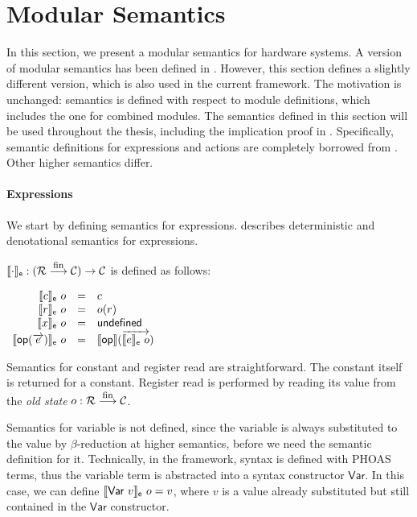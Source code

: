 \section{Modular Semantics}
\label{sec-semmod}

In this section, we present a modular semantics for hardware
systems. A version of modular semantics has been defined in
\cite{murali-thesis}.  However, this section defines a slightly
different version, which is also used in the current \Kami{}
framework.  The motivation is unchanged: semantics is defined with
respect to module definitions, which includes the one for combined
modules. The semantics defined in this section will be used throughout
the thesis, including the implication proof in
. Specifically, semantic definitions for
expressions and actions are completely borrowed from
\cite{murali-thesis}. Other higher semantics differ.

\paragraph{Expressions}

We start by defining semantics for expressions. 
describes deterministic and denotational semantics \ssemexpr{\cdot}
for expressions.

\begin{definition}
  \label{def-semexpr}
  $\llbracket \cdot \rrbracket_{\textsf{e}} : (\mathcal{R} \stackrel{\textrm{\footnotesize{fin}}}{\longrightarrow} \mathcal{C}{}) \to \mathcal{C}$ is
  defined as follows:
  \begin{center}
    \begin{math}
      \begin{array}{rcl}
        \llbracket c \rrbracket_{\textsf{e}}\ o & = & c \\
        \llbracket r \rrbracket_{\textsf{e}}\ o & = & o(r) \\
        \llbracket x \rrbracket_{\textsf{e}}\ o & = & \textsf{undefined} \\
        \llbracket \textsf{op}{}(\overrightarrow{e}) \rrbracket_{\textsf{e}}\ o & = & \llbracket \textsf{op}{} \rrbracket(\overrightarrow{\llbracket e \rrbracket_{\textsf{e}}\ o}) \\
      \end{array}
    \end{math}
  \end{center}
\end{definition}

Semantics for constant and register read are straightforward. The
constant itself is returned for a constant. Register read is performed
by reading its value from the \emph{old state} $o: \mathcal{R} \stackrel{\textrm{\footnotesize{fin}}}{\longrightarrow} \mathcal{C}$.

Semantics for variable is not defined, since the variable is always
substituted to the value by $\beta$-reduction at higher semantics,
before we need the semantic definition for it.  Technically, in the
\Kami{} framework, syntax is defined with PHOAS~\cite{adam-icfp}
terms, thus the variable term is abstracted into a syntax constructor
$\textsf{Var}$. In this case, we can define
$\llbracket \textsf{Var}\ v \rrbracket_{\textsf{e}}\ o = v$, where $v$ is a value already
substituted but still contained in the $\textsf{Var}$ constructor.

